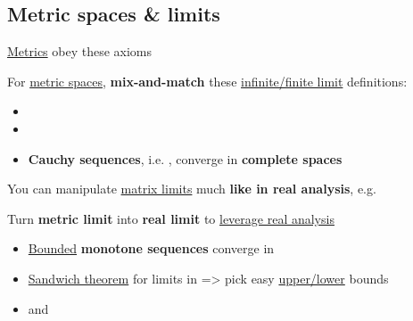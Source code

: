 \subsection*{Metric spaces \& limits}

\underline{Metrics} obey these axioms


\hSep %

For \underline{metric spaces}, \textbf{mix-and-match} these \underline{infinite/finite limit}
definitions:
\begin{itemize}
      \item
      \item
      \item
            \textbf{Cauchy sequences},
            i.e. ,
            converge in \textbf{complete spaces}
\end{itemize}
You can manipulate \underline{matrix limits} much \textbf{like in real analysis},
e.g. 

\hSep %

Turn \textbf{metric limit}  into \textbf{real limit}
 to \underline{leverage real analysis}
\begin{itemize}
      \item
            \underline{Bounded} \textbf{monotone sequences} converge in 
      \item
            \underline{Sandwich theorem} for limits in  =>
            pick easy \underline{upper/lower} bounds
      \item
             and
\end{itemize}

